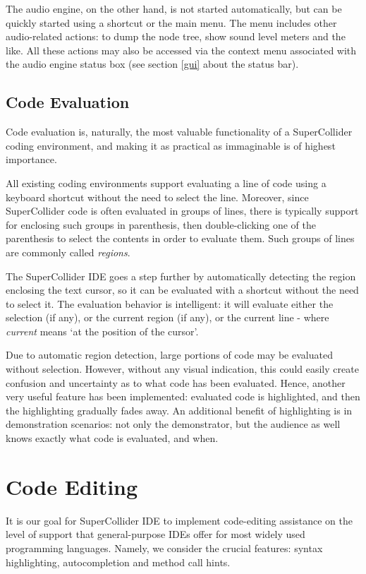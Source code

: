 \documentclass[11pt,a4paper]{article}
\begin{document}
The audio engine, on the other hand, is not started automatically, but can be quickly started using a shortcut or the
main menu. The menu includes other audio-related actions: to dump the node tree, show sound level meters and the like.
All these actions may also be accessed via the context menu associated with the audio engine status box (see section
\ref{gui} about the status bar).

\subsection{Code Evaluation}

Code evaluation is, naturally, the most valuable functionality of a SuperCollider coding environment, and making it as
practical as immaginable is of highest importance.

All existing coding environments support evaluating a line of code using a keyboard shortcut without the need to select
the line. Moreover, since SuperCollider code is often evaluated in groups of lines, there is typically support for
enclosing such groups in parenthesis, then double-clicking one of the parenthesis to select the contents in order to
evaluate them. Such groups of lines are commonly called \emph{regions}.

The SuperCollider IDE goes a step further by automatically detecting the region enclosing the text cursor, so it can be
evaluated with a shortcut without the need to select it. The evaluation behavior is intelligent: it will evaluate
either the selection (if any), or the current region (if any), or the current line - where \emph{current} means `at the
position of the cursor'.

Due to automatic region detection, large portions of code may be evaluated without selection. However, without any
visual indication, this could easily create confusion and uncertainty as to what code has been evaluated. Hence,
another very useful feature has been implemented: evaluated code is highlighted, and then the highlighting gradually
fades away. An additional benefit of highlighting is in demonstration scenarios: not only the demonstrator, but the
audience as well knows exactly what code is evaluated, and when.

\section{Code Editing}

It is our goal for SuperCollider IDE to implement code-editing assistance on the level of support
that general-purpose IDEs offer for most widely used programming languages. Namely,
we consider the crucial features: syntax highlighting, autocompletion and method call hints.
\end{document}
